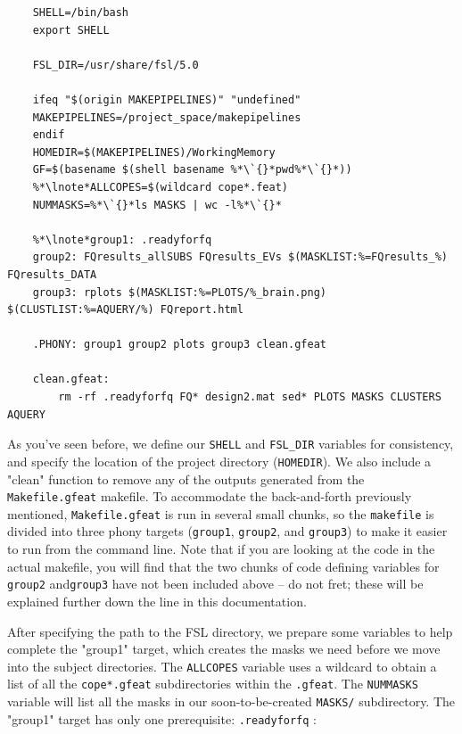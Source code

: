 \begin{lstlisting}
	SHELL=/bin/bash
	export SHELL
	
	FSL_DIR=/usr/share/fsl/5.0
	
	ifeq "$(origin MAKEPIPELINES)" "undefined"
	MAKEPIPELINES=/project_space/makepipelines
	endif
	HOMEDIR=$(MAKEPIPELINES)/WorkingMemory
	GF=$(basename $(shell basename %*\`{}*pwd%*\`{}*))
	%*\lnote*ALLCOPES=$(wildcard cope*.feat) 
	NUMMASKS=%*\`{}*ls MASKS | wc -l%*\`{}*
	
	%*\lnote*group1: .readyforfq
	group2: FQresults_allSUBS FQresults_EVs $(MASKLIST:%=FQresults_%) FQresults_DATA
	group3: rplots $(MASKLIST:%=PLOTS/%_brain.png) $(CLUSTLIST:%=AQUERY/%) FQreport.html
	
	.PHONY: group1 group2 plots group3 clean.gfeat 
	
	clean.gfeat:
		rm -rf .readyforfq FQ* design2.mat sed* PLOTS MASKS CLUSTERS AQUERY
\end{lstlisting}
As you've seen before, we define our \texttt{SHELL} and \texttt{FSL_DIR} variables for consistency, and specify the location of the project directory (\texttt{HOMEDIR}). We also include a "clean" function to remove any of the outputs generated from the \texttt{Makefile.gfeat} makefile. To accommodate the back-and-forth previously mentioned, \texttt{Makefile.gfeat} is run in several small chunks, so the  \texttt{makefile} is divided into three phony targets (\texttt{group1}, \texttt{group2}, and \texttt{group3}) to make it easier to run from the command line. Note that if you are looking at the code in the actual makefile, you will find that the two chunks of code defining variables for \texttt{group2} and\texttt{group3} have not been included above -- do not fret; these will be explained further down the line in this documentation. 

After specifying the path to the FSL directory, we prepare some variables to help \maken{} complete the "group1" target, which creates the masks we need before we move into the subject directories.  The \texttt{ALLCOPES} variable uses a wildcard to obtain a list of all the \texttt{cope*.gfeat} subdirectories within the \texttt{.gfeat}. The \texttt{NUMMASKS} variable will list all the masks in our soon-to-be-created \texttt{MASKS/} subdirectory.  The "group1" target has only one prerequisite: \texttt{.readyforfq} :

